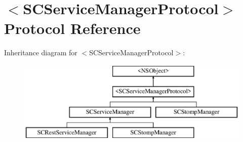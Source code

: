 \hypertarget{protocol_s_c_service_manager_protocol-p}{}\section{$<$S\+C\+Service\+Manager\+Protocol$>$ Protocol Reference}
\label{protocol_s_c_service_manager_protocol-p}
Inheritance diagram for $<$S\+C\+Service\+Manager\+Protocol$>$\+:\begin{figure}[H]
\begin{center}
\leavevmode
\includegraphics[height=3.868739cm]{protocol_s_c_service_manager_protocol-p}
\end{center}
\end{figure}
